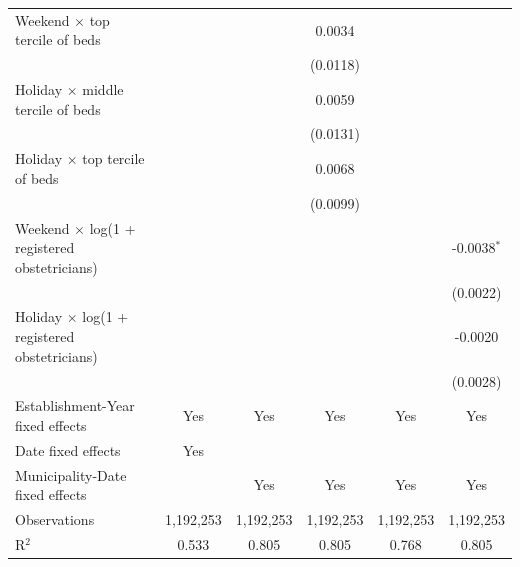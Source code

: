 \begin{table}
{\begin{tabular}{lccccc}
\addlinespace[2pt]
      Weekend $\times$ top tercile of beds                         &                &           & 0.0034        &               &   \\   
                                                                   &                &           & (0.0118)      &               &   \\   
\addlinespace[2pt]
      Holiday $\times$ middle tercile of beds             &                &           & 0.0059        &               &   \\   
                                                                   &                &           & (0.0131)      &               &   \\   
\addlinespace[2pt]
      Holiday $\times$ top tercile of beds                &                &           & 0.0068        &               &   \\   
                                                                   &                &           & (0.0099)      &               &   \\   
\addlinespace[2pt]
      Weekend $\times$ log(1 + registered obstetricians)           &                &           &               &               & -0.0038$^{*}$\\   
                                                                   &                &           &               &               & (0.0022)\\   
\addlinespace[2pt]
      Holiday $\times$ log(1 + registered obstetricians)  &                &           &               &               & -0.0020\\   
                                                                   &                &           &               &               & (0.0028)\\   
\addlinespace[2pt]
      \midrule
      Establishment-Year fixed effects & Yes            & Yes       & Yes           & Yes           & Yes\\  
      Date fixed effects & Yes            &           &               &               & \\  
      Municipality-Date fixed effects &                & Yes       & Yes           & Yes           & Yes\\  
      \midrule
      Observations                                                 & 1,192,253      & 1,192,253 & 1,192,253     & 1,192,253     & 1,192,253\\  
      R$^2$                                                        & 0.533          & 0.805     & 0.805         & 0.768         & 0.805\\  

\end{tabular}}
\end{table}
